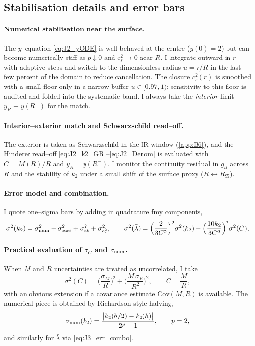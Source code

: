 \documentclass{iopjournal}
\begin{document}
\subsection{Stabilisation details and error bars}\label{app:J3}
\paragraph{Numerical stabilisation near the surface.}
The $y$–equation \eqref{eq:J2_yODE} is well behaved at the centre ($y(0)=2$) but can become numerically stiff as $p\!\downarrow\!0$ and $c_s^2\!\to\!0$ near $R$. I integrate outward in $r$ with adaptive steps and switch to the dimensionless radius $u=r/R$ in the last few percent of the domain to reduce cancellation. The closure $c_s^2(r)$ is smoothed with a small floor only in a narrow buffer $u\in[0.97,1)$; sensitivity to this floor is audited and folded into the systematic band. I always take the \emph{interior} limit $y_R\equiv y(R^-)$ for the match.

\paragraph{Interior–exterior match and Schwarzschild read–off.}
The exterior is taken as Schwarzschild in the IR window (\cref{app:B6}), and the Hinderer read–off \eqref{eq:J2_k2_GR}–\eqref{eq:J2_Denom} is evaluated with $C=M(R)/R$ and $y_R=y(R^-)$. I monitor the continuity residual in $g_{tt}$ across $R$ and the stability of $k_2$ under a small shift of the surface proxy ($R\leftrightarrow R_{95}$).

\paragraph{Error model and combination.}
I quote one–sigma bars by adding in quadrature fmy components,
\begin{equation}
\sigma^2(k_2)=\sigma^2_{\rm num}+\sigma^2_{\rm surf}+\sigma^2_{\rm fit}+\sigma^2_{c_s^2},
\qquad
\sigma^2(\bar\lambda)=\Big(\frac{2}{3C^5}\Big)^2\sigma^2(k_2)+\Big(\frac{10k_2}{3C^6}\Big)^2\sigma^2(C),
\label{eq:J3_err_combo}
\end{equation}
\paragraph{Practical evaluation of $\sigma_C$ and $\sigma_{\rm num}$.}
When $M$ and $R$ uncertainties are treated as uncorrelated, I take
\begin{equation}
\sigma^2(C)=\Big(\frac{\sigma_M}{R}\Big)^{\!2}
+\Big(\frac{M\,\sigma_R}{R^{2}}\Big)^{\!2}\!,
\qquad C=\frac{M}{R},
\label{eq:J3_sigmaC}
\end{equation}
with an obvious extension if a covariance estimate $\mathrm{Cov}(M,R)$ is available. The numerical piece is obtained by Richardson-style halving,
\begin{equation}
\sigma_{\rm num}(k_2)=\frac{\big|k_2(h/2)-k_2(h)\big|}{2^{p}-1},
\qquad p=2,
\label{eq:J3_sigma_num}
\end{equation}
and similarly for $\bar\lambda$ via \eqref{eq:J3_err_combo}.
\end{document}
